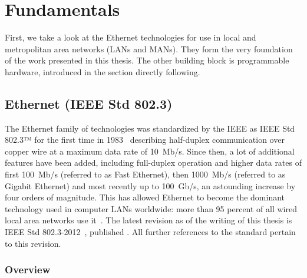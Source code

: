 \documentclass[a4paper, 11pt, oneside]{Thesis}  %
\begin{document}

\chapter{Fundamentals}\label{ch:fundamentals}

First, we take a look at the Ethernet technologies for use in local and metropolitan area networks (LANs and MANs). They form the very foundation of the work presented in this thesis. The other building block is programmable hardware, introduced in the section directly following.

\section{Ethernet (IEEE Std 802.3)}

The Ethernet family of technologies was standardized by the IEEE as IEEE Std 802.3™ for the first time in 1983~\cite{Ethernet30Years} describing half-duplex communication over copper wire at a maximum data rate of 10~Mb/s. Since then, a lot of additional features have been added, including full-duplex operation and higher data rates of first 100~Mb/s (referred to as Fast Ethernet), then 1000~Mb/s (referred to as Gigabit Ethernet) and most recently up to 100~Gb/s, an astounding increase by four orders of magnitude. This has allowed Ethernet to become the dominant technology used in computer LANs worldwide: more than 95 percent of all wired local area networks use it~\cite{heiseEthernet}. The latest revision as of the writing of this thesis is IEEE Std 802.3-2012~\cite{Ethernet}, published . All further references to the standard pertain to this revision. 

\subsection{Overview}\label{ch:ethernet_overview}
\end{document}
